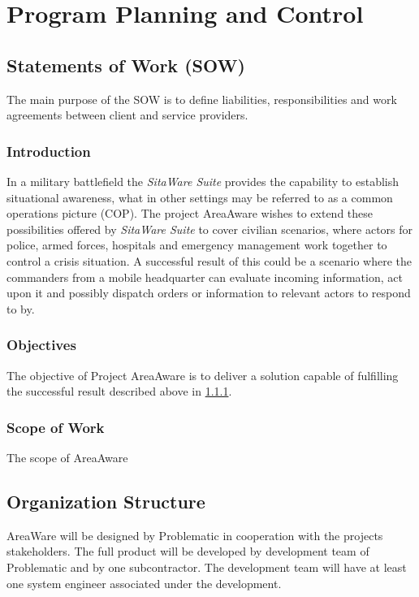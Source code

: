 %
\thispagestyle{fancy}
\chapter{Program Planning and Control}
\label{chp:program_plan}


\section{Statements of Work (SOW)}
The main purpose of the SOW is to define liabilities, responsibilities and work agreements between client and service providers.

\subsection{Introduction}
\label{sec:sow_intro}
In a military battlefield the \emph{SitaWare Suite} provides the capability to establish situational awareness, what in other settings may be referred to as a common operations picture (COP).
The project AreaAware wishes to extend these possibilities offered by \emph{SitaWare Suite} to cover civilian scenarios, where actors for police, armed forces, hospitals and emergency management work together to control a crisis situation.
A successful result of this could be a scenario where the commanders from a mobile headquarter can evaluate incoming information, act upon it and possibly dispatch orders or information to relevant actors to respond to by.

\subsection{Objectives}
The objective of Project AreaAware is to deliver a solution capable of fulfilling the successful result described above in \ref{sec:sow_intro}.

\subsection{Scope of Work}
The scope of AreaAware



\section{Organization Structure}
AreaWare will be designed by Problematic in cooperation with the projects stakeholders.
The full product will be developed by development team of Problematic and by one subcontractor.
The development team will have at least one system engineer associated under the development.

